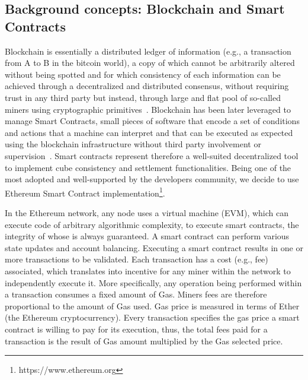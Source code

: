 \documentclass[chi_draft]{sigchi}
\begin{document}
{\subsection{Background concepts: Blockchain and Smart Contracts}  \label{sec:blockchain}
Blockchain is essentially a distributed ledger of information (e.g., a transaction from A to B in the bitcoin world), a copy of which cannot be arbitrarily altered without being spotted and for which consistency of each information can be achieved through a decentralized and distributed consensus, without requiring trust in any third party but instead, through large and flat pool of so-called miners using cryptographic primitives~\cite{nakamoto2008bitcoin}.
Blockchain has been later leveraged to manage Smart Contracts, small pieces of software that encode a set of conditions and actions that a machine can interpret and that can be executed as expected using the blockchain infrastructure without third party involvement or supervision~\cite{Buterin2014}. Smart contracts represent therefore a well-suited decentralized tool to implement cube consistency and settlement functionalities. Being one of the most adopted and well-supported by the developers community, we decide to use Ethereum Smart Contract implementation\footnote{https://www.ethereum.org}.

In the Ethereum network, any node uses a virtual machine (EVM), which can execute code of arbitrary algorithmic complexity, to execute smart contracts, the integrity of whose is always guaranteed. A smart contract can perform various state updates and account balancing.  
Executing a smart contract results in one or more transactions to be validated. Each transaction has a cost (e.g., fee) associated, which translates into incentive for any miner within the network to independently execute it. 
More specifically, any operation being performed within a transaction consumes a fixed amount of Gas. Miners fees are therefore proportional to the amount of Gas used. Gas price is measured in terms of Ether (the Ethereum cryptocurrency). Every transaction specifies the gas price a smart contract is willing to pay for its execution, thus, the total fees paid for a transaction is the result of Gas amount multiplied by the Gas selected price.




}
\end{document}
